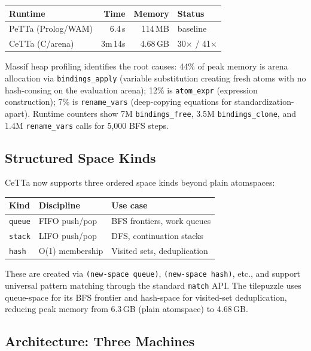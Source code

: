 \documentclass[11pt]{article}
\newcommand{\code}[1]{\texttt{#1}}
\newcommand{\PeTTa}{\textup{PeTTa}}
\newcommand{\CeTTa}{\textup{CeTTa}}
\begin{document}
\begin{center}
\begin{tabular}{lrrl}
\toprule
Runtime & Time & Memory & Status \\
\midrule
\PeTTa{} (Prolog/WAM) & 6.4\,s & 114\,MB & baseline \\
\CeTTa{} (C/arena) & 3m\,14s & 4.68\,GB & 30$\times$ / 41$\times$ \\
\bottomrule
\end{tabular}
\end{center}

Massif heap profiling identifies the root causes:
44\% of peak memory is arena allocation via \code{bindings\_apply}
(variable substitution creating fresh atoms with no hash-consing on
the evaluation arena); 12\% is \code{atom\_expr} (expression
construction); 7\% is \code{rename\_vars} (deep-copying equations
for standardization-apart).  Runtime counters show 7M
\code{bindings\_free}, 3.5M \code{bindings\_clone}, and 1.4M
\code{rename\_vars} calls for 5{,}000 BFS steps.

\subsection{Structured Space Kinds}

\CeTTa{} now supports three ordered space kinds beyond plain atomspaces:

\begin{center}
\begin{tabular}{lll}
\toprule
Kind & Discipline & Use case \\
\midrule
\code{queue} & FIFO push/pop & BFS frontiers, work queues \\
\code{stack} & LIFO push/pop & DFS, continuation stacks \\
\code{hash} & O(1) membership & Visited sets, deduplication \\
\bottomrule
\end{tabular}
\end{center}

These are created via \code{(new-space queue)}, \code{(new-space hash)},
etc., and support universal pattern matching through the standard
\code{match} API\@.  The tilepuzzle uses queue-space for its BFS
frontier and hash-space for visited-set deduplication, reducing
peak memory from 6.3\,GB (plain atomspace) to 4.68\,GB.

\subsection{Architecture: Three Machines}
\end{document}
